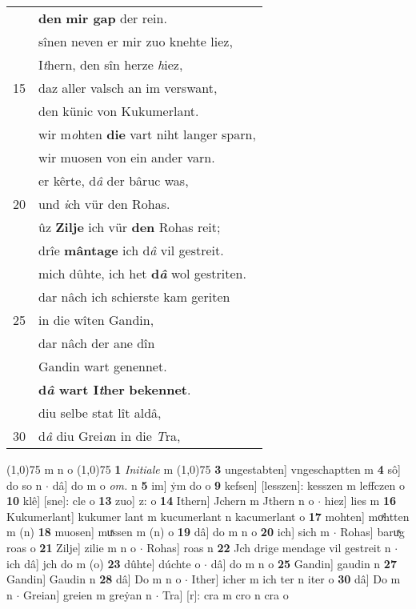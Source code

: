 \documentclass[8pt,a4paper,notitlepage]{article}
\begin{document}
\begin{table}[ht]
\begin{minipage}[t]{0.5\linewidth}
\begin{tabular}{rl}
 & \textbf{den} \textbf{mir gap} der rein.\\ 
 & sînen neven er mir zuo knehte liez,\\ 
 & I\textit{t}hern, den sîn herze \textit{h}iez,\\ 
15 & daz aller valsch an im verswant,\\ 
 & den künic von Kukumerlant.\\ 
 & wir m\textit{o}hten \textbf{die} vart niht langer sparn,\\ 
 & wir muosen von ein ander varn.\\ 
 & er kêrte, d\textit{â} der bâruc was,\\ 
20 & und \textit{i}ch vür den Rohas.\\ 
 & ûz \textbf{Zilje} ich vür \textbf{den} Rohas reit;\\ 
 & drîe \textbf{mântage} ich d\textit{â} vil gestreit.\\ 
 & mich dûhte, ich het \textbf{d\textit{â}} wol gestriten.\\ 
 & dar nâch ich schierste kam geriten\\ 
25 & in die wîten Gandin,\\ 
 & dar nâch der ane dîn\\ 
 & Gandin wart genennet.\\ 
 & \textbf{d\textit{â} wart I\textit{t}her} \textbf{bekennet}.\\ 
 & diu selbe stat lît aldâ,\\ 
30 & d\textit{â} diu Grei\textit{a}n in die \textit{T}ra,\\ 
\end{tabular}
\scriptsize
\line(1,0){75} \newline
m n o \newline
\line(1,0){75} \newline
\textbf{1} \textit{Initiale} m  \newline
\line(1,0){75} \newline
\textbf{3} ungestabten] vngeschaptten m \textbf{4} sô] do so n  $\cdot$ dâ] do m o \textit{om.} n \textbf{5} im] ẏm do o \textbf{9} kefsen] [lesszen]: kesszen m leffczen o \textbf{10} klê] [sne]: cle o \textbf{13} zuo] z: o \textbf{14} Ithern] Jchern m Jthern n o  $\cdot$ hiez] lies m \textbf{16} Kukumerlant] kukumer lant m kucumerlant n kacumerlant o \textbf{17} mohten] moͯhtten m (n) \textbf{18} muosen] muͯssen m (n) o \textbf{19} dâ] do m n o \textbf{20} ich] sich m  $\cdot$ Rohas] baruͯg roas o \textbf{21} Zilje] zilie m n o  $\cdot$ Rohas] roas n \textbf{22} Jch drige mendage vil gestreit n  $\cdot$ ich dâ] jch do m (o) \textbf{23} dûhte] dúchte o  $\cdot$ dâ] do m n o \textbf{25} Gandin] gaudin n \textbf{27} Gandin] Gaudin n \textbf{28} dâ] Do m n o  $\cdot$ Ither] icher m ich ter n iter o \textbf{30} dâ] Do m n  $\cdot$ Greian] greien m greẏan n  $\cdot$ Tra] [r]: cra m cro n cra o \newline
\end{minipage}
\end{table}
\end{document}
